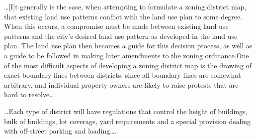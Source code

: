 
\ldots [I]t generally is the case, when attempting to formulate a zoning
district map, that existing land use patterns conflict with the land use plan to
some degree. When this occurs, a compromise must be made between existing land
use patterns and the city's desired land use pattern as developed in the land
use plan. The land use plan then becomes a guide for this decision process, as
well as a guide to be followed in making later amendments to the zoning
ordinance.One of the most difficult aspects of developing a zoning district map
is the drawing of exact boundary lines between districts, since all boundary
lines are somewhat arbitrary, and individual property owners are likely to raise
protests that are hard to resolve\ldots .



\ldots Each type of district will have regulations that control the height of
buildings, bulk of buildings, lot coverage, yard requirements and a special
provision dealing with off-street parking and loading\ldots .

